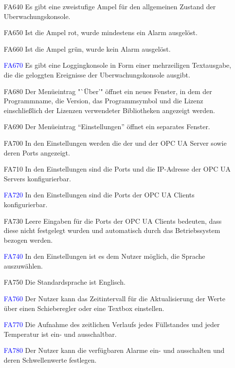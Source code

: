 \documentclass[parskip=full]{scrartcl}
\begin{document}
\begin{enumerate}
    \gls{Fertigungssimulation} nicht mehr aktiv ist und die \gls{Uberwachungskonsole} mit der nächsten Aktualisierung der \glspl{Sensordatum} über das Ende informiert wurde.
  \item[FA640] Es gibt eine zweistufige Ampel für den allgemeinen Zustand der \gls{Uberwachungskonsole}.
  \item[FA650] Ist die Ampel rot, wurde mindestens ein Alarm ausgelöst.
  \item[FA660] Ist die Ampel grün, wurde kein Alarm ausgelöst.
  \item[\textcolor{blue}{FA670}] Es gibt eine Loggingkonsole in Form einer mehrzeiligen Textausgabe, die die geloggten Ereignisse der \gls{Uberwachungskonsole} ausgibt.
  \item[FA680] Der Menüeintrag "`Über'" öffnet ein neues Fenster, in dem der Programmname, die Version, das Programmsymbol und die Lizenz einschließlich der Lizenzen verwendeter Bibliotheken angezeigt werden.
  \item[FA690] Der Menüeintrag "`Einstellungen"' öffnet ein separates Fenster.
  \item[FA700] In den Einstellungen werden die  der  und der \gls{OPC UA Server} sowie deren Ports angezeigt.
  \item[FA710] In den Einstellungen sind die Ports und die IP-Adresse der \glspl{OPC UA Server} konfigurierbar.
  \item[\textcolor{blue}{FA720}] In den Einstellungen sind die Ports der \glspl{OPC UA Client} konfigurierbar.
  \item[FA730] Leere Eingaben für die Ports der \glspl{OPC UA Client} bedeuten, dass diese nicht festgelegt wurden und automatisch durch das Betriebssystem bezogen werden.
  \item[\textcolor{blue}{FA740}] In den Einstellungen ist es dem Nutzer möglich, die Sprache auszuwählen.
  \item[FA750] Die Standardsprache ist Englisch.
  \item[\textcolor{blue}{FA760}] Der Nutzer kann das Zeitintervall für die Aktualisierung der Werte über einen Schieberegler oder eine Textbox einstellen.
  \item[\textcolor{blue}{FA770}] Die Aufnahme des zeitlichen Verlaufs jedes Füllstandes und jeder Temperatur ist ein- und ausschaltbar.
  \item[\textcolor{blue}{FA780}] Der Nutzer kann die verfügbaren Alarme ein- und ausschalten und deren Schwellenwerte festlegen.

\end{enumerate}
\end{document}
